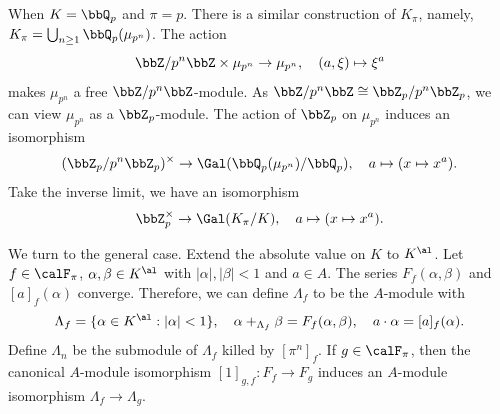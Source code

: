   When $K = \bbQ_p$ and $\pi = p$.
  There is a similar construction of $K_\pi$, namely, $K_\pi = \bigcup_{n \geq 1} \bbQ_p(\mu_{p^n})$. 
  The action 
  \[ \bbZ/p^n\bbZ \times \mu_{p^n} \to \mu_{p^n}, \quad (a, \xi) \mapsto \xi^a \]
  makes $\mu_{p^n}$ a free $\bbZ/p^n\bbZ$-module.
  As $\bbZ/p^n\bbZ \cong \bbZ_p/p^n\bbZ_p$, we can view $\mu_{p^n}$ as a $\bbZ_p$-module.
  The action of $\bbZ_p$ on $\mu_{p^n}$ induces an isomorphism 
  \[ (\bbZ_p/p^n\bbZ_p)^\times \to \Gal(\bbQ_p(\mu_{p^n})/\bbQ_p), \quad a \mapsto (x \mapsto x^a). \]
  Take the inverse limit, we have an isomorphism
  \[ \bbZ_p^\times \to \Gal(K_\pi/K), \quad a \mapsto (x \mapsto x^a). \]

  We turn to the general case.
  Extend the absolute value on $K$ to $K^\al$.
  Let $f \in \calF_\pi$, $\alpha, \beta \in K^\al$ with $|\alpha|, |\beta| < 1$ and $a \in A$.
  The series $F_f(\alpha, \beta)$ and $[a]_f(\alpha)$ converge.
  Therefore, we can define $\Lambda_f$ to be the $A$-module with 
  \[ \Lambda_f = \{ \alpha \in K^\al : |\alpha| < 1 \}, \quad \alpha +_{\Lambda_f} \beta = F_f(\alpha, \beta), \quad a \cdot \alpha = [a]_f(\alpha). \]
  Define $\Lambda_n$ be the submodule of $\Lambda_f$ killed by $[\pi^n]_f$.
  If $g \in \calF_\pi$, then the canonical $A$-module isomorphism $[1]_{g,f} : F_f \to F_g$ induces an $A$-module isomorphism $\Lambda_f \to \Lambda_g$.











